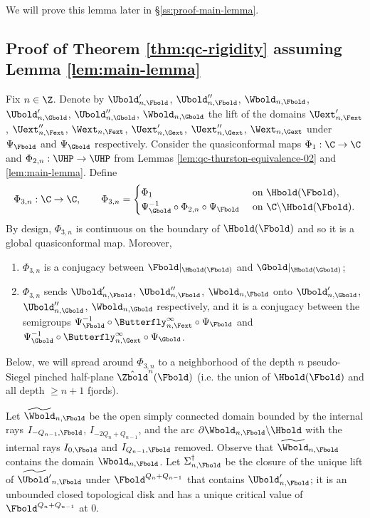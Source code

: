 \documentclass{amsart}
\begin{document}
We will prove this lemma later in \S\ref{ss:proof-main-lemma}.

\subsection{Proof of Theorem \ref{thm:qc-rigidity} assuming Lemma \ref{lem:main-lemma}}
\label{ss:proof-qc-rigidity}

    Fix $n \in \Z$.
    Denote by $\Ubold'_{n,\Fbold}$, $\Ubold''_{n,\Fbold}$, $\Wbold_{n,\Fbold}$, $\Ubold'_{n,\Gbold}$, $\Ubold''_{n,\Gbold}$, $\Wbold_{n,\Gbold}$ the lift of
    the domains $\Uext'_{n,\Fext}$, $\Uext''_{n,\Fext}$, $\Wext_{n,\Fext}$, $\Uext'_{n,\Gext}$, $\Uext''_{n,\Gext}$, $\Wext_{n,\Gext}$ under $\Psi_\Fbold$ and $\Psi_\Gbold$ respectively. 
    Consider the quasiconformal maps $\Phi_1: \C \to \C$ and $\Phi_{2,n}: \UHP \to \UHP$ from Lemmas \ref{lem:qc-thurston-equivalence-02} and \ref{lem:main-lemma}.
    Define
    \[
        \Phi_{3,n}: \C \to \C, \qquad
        \Phi_{3,n} = \begin{cases}
            \Phi_{1} & \text{ on } \Hbold(\Fbold), \\
            \Psi_{\Gbold}^{-1} \circ \Phi_{2,n} \circ \Psi_{\Fbold} & \text{ on } \C \backslash \Hbold(\Fbold).
        \end{cases}
    \]
    By design, $\Phi_{3,n}$ is continuous on the boundary of $\Hbold(\Fbold)$ and so it is a global quasiconformal map.
    Moreover,
    \begin{enumerate}[label=\textnormal{(\roman*)}]
        \item \label{equivariance-hedgehog} $\Phi_{3,n}$ is a conjugacy between $\Fbold|_{\Hbold(\Fbold)}$ and $\Gbold|_{\Hbold(\Gbold)}$;
        \item \label{equivariance-butterfly} $\Phi_{3,n}$ sends $\Ubold'_{n,\Fbold}$, $\Ubold''_{n,\Fbold}$, $\Wbold_{n,\Fbold}$ onto $\Ubold'_{n,\Gbold}$, $\Ubold''_{n,\Gbold}$, $\Wbold_{n,\Gbold}$ respectively, and it is a conjugacy between the semigroups $\Psi_{\Fbold}^{-1} \circ \Butterfly_{n,\Fext}^\infty \circ \Psi_{\Fbold}$ and $\Psi_{\Gbold}^{-1} \circ \Butterfly_{n,\Gext}^\infty \circ \Psi_{\Gbold}$.
    \end{enumerate}
    Below, we will spread around $\Phi_{3,n}$ to a neighborhood of the depth $n$ pseudo-Siegel pinched half-plane $\hat{\Zbold}^n(\Fbold)$ (i.e. the union of $\Hbold(\Fbold)$ and all depth $\geq n+1$ fjords).

    Let $\widetilde{\Wbold}_{n,\Fbold}$ be the open simply connected domain bounded by the internal rays $I_{-Q_{n-1},\Fbold}$, $I_{-2Q_n+Q_{n-1}}$, and the arc $\partial \Wbold_{n,\Fbold} \backslash \Hbold$ with the internal rays $I_{0,\Fbold}$ and $I_{Q_{n-1},\Fbold}$ removed.
    Observe that $\widetilde{\Wbold}_{n,\Fbold}$ contains the domain $\Wbold_{n,\Fbold}$.
    Let $\Sigma^\dagger_{n,\Fbold}$ be the closure of the unique lift of $\widetilde{\Ubold'}_{n,\Fbold}$ under $\Fbold^{Q_n+Q_{n-1}}$ that contains $\Ubold'_{n,\Fbold}$; it is an unbounded closed topological disk and has a unique critical value of $\Fbold^{Q_n+Q_{n-1}}$ at $0$.
\end{document}
